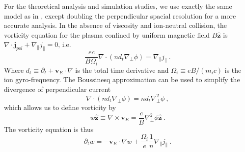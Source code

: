 \documentclass[aps,pre,twocolumn,superscriptaddress]{revtex4-1}
\begin{document}
For the theoretical analysis and simulation studies, we use exactly the same model as in \cite{PhysRevE.100.033212}, except doubling the perpendicular spacial resolution 
for a more accurate analysis. In the absence of viscosity and ion-neutral collision, the vorticity equation for the plasma confined by uniform magnetic field $B\hat{\bm{z}}$ 
is $\nabla\cdot\bm{j}_{pol}+\nabla_{\parallel}j_{\parallel}=0$, i.e.
\begin{equation}
	\frac{ec}{B\Omega_{i}}\nabla\cdot\left(nd_{t}\nabla_{\perp}\phi\right)
=\nabla_{\parallel}j_{\parallel}~.
\label{eq:continuity}
\end{equation}
Where $d_{t}\equiv\partial_{t}+\bm{v}_{E}\cdot\nabla$ is the total time derivative and $\Omega_{i}\equiv eB/\left(m_{i}c\right)$ is the ion gyro-frequency. The Boussinesq approximation \cite{Ricci_2012} can be used to simplify the divergence of perpendicular current
\begin{equation}
	\nabla\cdot\left(nd_{t}\nabla_{\perp}\phi\right)=nd_{t}\nabla_{\perp}^{2}\phi~,
\label{eq:Boussinesq}
\end{equation}
which allows us to define vorticity by
\begin{equation}
	w\hat{\bm{z}}\equiv\nabla\times\bm{v}_{E}
	=\frac{c}{B}\nabla_{\perp}^{2}\phi\hat{\bm{z}}~.
\end{equation}
The vorticity equation  is thus
\begin{equation}
	\partial_{t}w=-\bm{v}_{E}\cdot\nabla w
	+\frac{\Omega_{i}}{e}\frac{1}{n}\nabla_{\parallel}j_{\parallel}~.
\label{eq:vorticity}
\end{equation}
\end{document}
